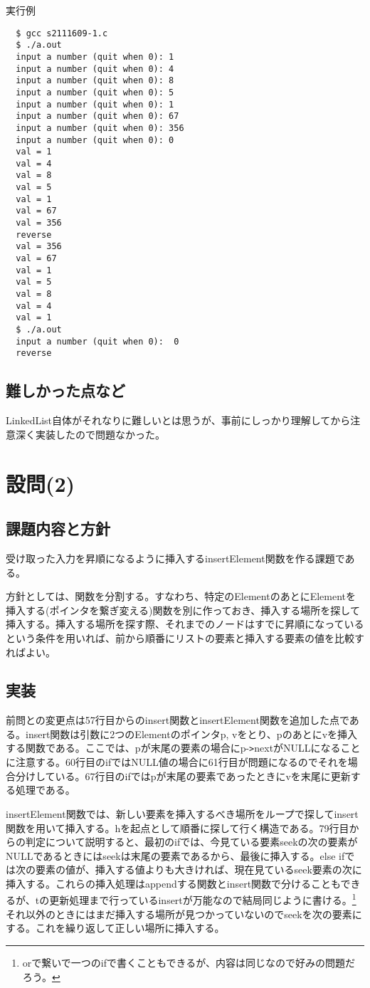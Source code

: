 \documentclass[dvipdfmx,12pt,a4j]{jarticle}
\begin{document}
\begin{itembox}[l]{実行例}
\begin{verbatim}
  $ gcc s2111609-1.c
  $ ./a.out
  input a number (quit when 0): 1
  input a number (quit when 0): 4
  input a number (quit when 0): 8
  input a number (quit when 0): 5
  input a number (quit when 0): 1
  input a number (quit when 0): 67
  input a number (quit when 0): 356
  input a number (quit when 0): 0
  val = 1
  val = 4
  val = 8
  val = 5
  val = 1
  val = 67
  val = 356
  reverse
  val = 356
  val = 67
  val = 1
  val = 5
  val = 8
  val = 4
  val = 1
  $ ./a.out 
  input a number (quit when 0):  0
  reverse
\end{verbatim}
\end{itembox}

\subsection{難しかった点など}
LinkedList自体がそれなりに難しいとは思うが、事前にしっかり理解してから注意深く実装したので問題なかった。

\section{設問(2)}
\subsection{課題内容と方針}
受け取った入力を昇順になるように挿入するinsertElement関数を作る課題である。

方針としては、関数を分割する。すなわち、特定のElementのあとにElementを挿入する(ポインタを繋ぎ変える)関数を別に作っておき、挿入する場所を探して挿入する。挿入する場所を探す際、それまでのノードはすでに昇順になっているという条件を用いれば、前から順番にリストの要素と挿入する要素の値を比較すればよい。

\subsection{実装}
前問との変更点は57行目からのinsert関数とinsertElement関数を追加した点である。insert関数は引数に2つのElementのポインタp, vをとり、pのあとにvを挿入する関数である。ここでは、pが末尾の要素の場合にp-\verb+>+nextがNULLになることに注意する。60行目のifではNULL値の場合に61行目が問題になるのでそれを場合分けしている。67行目のifではpが末尾の要素であったときにvを末尾に更新する処理である。

insertElement関数では、新しい要素を挿入するべき場所をループで探してinsert関数を用いて挿入する。hを起点として順番に探して行く構造である。79行目からの判定について説明すると、最初のifでは、今見ている要素seekの次の要素がNULLであるときにはseekは末尾の要素であるから、最後に挿入する。else ifでは次の要素の値が、挿入する値よりも大きければ、現在見ているseek要素の次に挿入する。これらの挿入処理はappendする関数とinsert関数で分けることもできるが、tの更新処理まで行っているinsertが万能なので結局同じように書ける。\footnote{orで繋いで一つのifで書くこともできるが、内容は同じなので好みの問題だろう。}
それ以外のときにはまだ挿入する場所が見つかっていないのでseekを次の要素にする。これを繰り返して正しい場所に挿入する。
\end{document}
